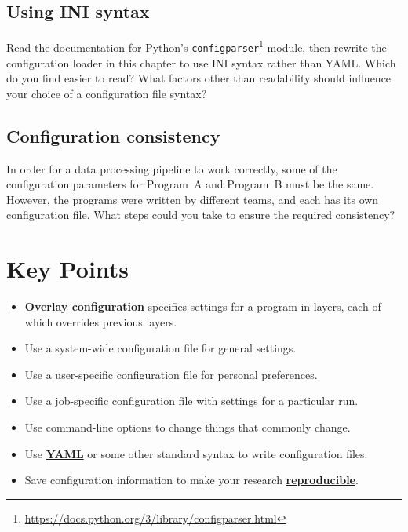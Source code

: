 \documentclass[
]{krantz}
\providecommand{\tightlist}{%
  \setlength{\itemsep}{0pt}\setlength{\parskip}{0pt}}
\renewcommand{\href}[2]{#2\footnote{\url{#1}}}
\newcommand{\gref}[2]{\hyperlink{#2}{\textbf{#1}}}
\begin{document}
\hypertarget{config-ex-ini}{%
\subsection{Using INI syntax}\label{config-ex-ini}}

Read the documentation for Python's \href{https://docs.python.org/3/library/configparser.html}{\texttt{configparser}} module,
then rewrite the configuration loader in this chapter to use INI syntax rather than YAML.
Which do you find easier to read?
What factors other than readability should influence your choice of a configuration file syntax?

\hypertarget{config-ex-consistency}{%
\subsection{Configuration consistency}\label{config-ex-consistency}}

In order for a data processing pipeline to work correctly,
some of the configuration parameters for Program~A and Program~B must be the same.
However,
the programs were written by different teams,
and each has its own configuration file.
What steps could you take to ensure the required consistency?

\hypertarget{config-keypoints}{%
\section{Key Points}\label{config-keypoints}}

\begin{itemize}
\tightlist
\item
  \gref{Overlay configuration}{overlay\_configuration} specifies settings for a program in layers,
  each of which overrides previous layers.
\item
  Use a system-wide configuration file for general settings.
\item
  Use a user-specific configuration file for personal preferences.
\item
  Use a job-specific configuration file with settings for a particular run.
\item
  Use command-line options to change things that commonly change.
\item
  Use \gref{YAML}{yaml\_glossary} or some other standard syntax to write configuration files.
\item
  Save configuration information to make your research \gref{reproducible}{reproducible\_research}.
\end{itemize}
\end{document}
